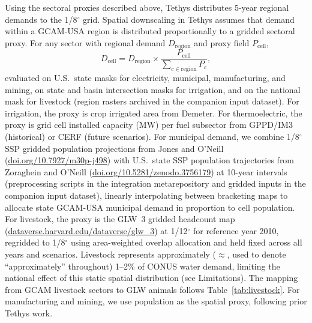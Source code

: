 \documentclass[fleqn,10pt]{wlscirep}
\begin{document}
Using the sectoral proxies described above, Tethys distributes 5-year regional demands to the 1/8$^{\circ}$ grid. Spatial downscaling in Tethys assumes that demand within a GCAM-USA region is distributed proportionally to a gridded sectoral proxy. For any sector with regional demand $D_{\mathrm{region}}$ and proxy field $P_{\mathrm{cell}}$,
\begin{equation}
D_{\mathrm{cell}} = D_{\mathrm{region}} \times \frac{P_{\mathrm{cell}}}{\sum_{c \in \mathrm{region}} P_{c}},
\label{eq:spatial}
\end{equation}
evaluated on U.S.\ state masks for electricity, municipal, manufacturing, and mining, on state and basin intersection masks for irrigation, and on the national mask for livestock (region rasters archived in the companion input dataset\cite{brackenDataTethys_integration_metarepo}). For irrigation, the proxy is crop irrigated area from Demeter. For thermoelectric, the proxy is grid cell installed capacity (MW) per fuel subsector from GPPD/IM3 (historical) or CERF (future scenarios). For municipal demand, we combine 1/8$^{\circ}$ SSP gridded population projections from Jones and O'Neill\cite{Jones_2016,Jones2020SEDAC} (\href{https://doi.org/10.7927/m30p-j498}{doi.org/10.7927/m30p-j498}) with U.S.\ state SSP population trajectories from Zoraghein and O'Neill\cite{Zoraghein2020Zenodo} (\href{https://doi.org/10.5281/zenodo.3756179}{doi.org/10.5281/zenodo.3756179}) at 10-year intervals (preprocessing scripts in the integration metarepository\cite{cambrackenIMMMSFATethys_integration_metarepoV1012026} and gridded inputs in the companion input dataset\cite{brackenDataTethys_integration_metarepo}), linearly interpolating between bracketing maps to allocate state GCAM-USA municipal demand in proportion to cell population. For livestock, the proxy is the GLW~3 gridded headcount map\cite{Gilbert2018} (\href{https://dataverse.harvard.edu/dataverse/glw_3}{dataverse.harvard.edu/dataverse/glw\_3}) at 1/12$^{\circ}$ for reference year 2010, regridded to 1/8$^{\circ}$ using area-weighted overlap allocation and held fixed across all years and scenarios. Livestock represents approximately ($\approx$, used to denote ``approximately'' throughout) 1--2\% of CONUS water demand, limiting the national effect of this static spatial distribution (see Limitations). The mapping from GCAM livestock sectors to GLW animals follows Table~\ref{tab:livestock}. For manufacturing and mining, we use population as the spatial proxy, following prior Tethys work\cite{Khan2023}.
\end{document}

